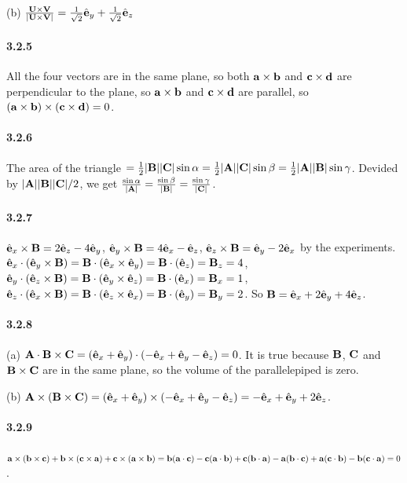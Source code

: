 \documentclass[a4paper]{article}
\begin{document}
(b) $\frac{\V{U}\times\V{V}}{|\V{U}\times\V{V}|}=\frac{1}{\sqrt{2}}\VE_y+\frac{1}{\sqrt{2}}\VE_z$

\paragraph{3.2.5}
All the four vectors are in the same plane, so both $\V{a}\times\V{b}$ and $\V{c}\times\V{d}$ are perpendicular to the plane, so $\V{a}\times\V{b}$ and $\V{c}\times\V{d}$ are parallel, so $(\V{a}\times\V{b})\times(\V{c}\times\V{d})=0$. 

\paragraph{3.2.6}
The area of the triangle $=\frac{1}{2}|\V{B}||\V{C}|\sin\alpha=\frac{1}{2}|\V{A}||\V{C}|\sin\beta=\frac{1}{2}|\V{A}||\V{B}|\sin\gamma$. Devided by $|\V{A}||\V{B}||\V{C}|/2$, we get $\frac{\sin\alpha}{|\V{A}|}=\frac{\sin\beta}{|\V{B}|}=\frac{\sin\gamma}{|\V{C}|}$.

\paragraph{3.2.7}
$\VE_x\times\V{B}=2\VE_z-4\VE_y$, $\VE_y\times\V{B}=4\VE_x-\VE_z$, $\VE_z\times\V{B}=\VE_y-2\VE_x$ by the experiments.  $\VE_x\cdot(\VE_y\times \V{B})=\V{B}\cdot(\VE_x\times\VE_y)=\V{B}\cdot(\VE_z)=\V{B}_z=4$, $\VE_y\cdot(\VE_z\times \V{B})=\V{B}\cdot(\VE_y\times\VE_z)=\V{B}\cdot(\VE_x)=\V{B}_x=1$, $\VE_z\cdot(\VE_x\times \V{B})=\V{B}\cdot(\VE_z\times\VE_x)=\V{B}\cdot(\VE_y)=\V{B}_y=2$. So $\V{B}=\VE_x+2\VE_y+4\VE_z$.

\paragraph{3.2.8}
(a) $\V{A}\cdot\V{B}\times\V{C}=(\VE_x+\VE_y)\cdot(-\VE_x+\VE_y-\VE_z)=0$. It is true because $\V{B}$, $\V{C}$ and $\V{B}\times\V{C}$ are in the same plane, so the volume of the parallelepiped is zero.

(b) $\V{A}\times(\V{B}\times\V{C})=(\VE_x+\VE_y)\times(-\VE_x+\VE_y-\VE_z)=-\VE_x+\VE_y+2\VE_z$.

\paragraph{3.2.9}
$\V{a}\times(\V{b}\times\V{c})+\V{b}\times(\V{c}\times\V{a})+\V{c}\times(\V{a}\times\V{b})=\V{b}(\V{a}\cdot\V{c})-\V{c}(\V{a}\cdot\V{b})+\V{c}(\V{b}\cdot\V{a})-\V{a}(\V{b}\cdot\V{c})+\V{a}(\V{c}\cdot\V{b})-\V{b}(\V{c}\cdot\V{a})=0$.
\end{document}
